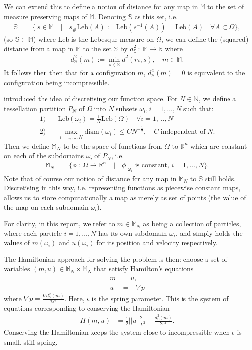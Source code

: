 \documentclass[11pt, oneside]{article}   	%
\newcommand{\R}{\mathbb{R}}
\newcommand{\MN}{\mathbb{M}_N}
\newcommand{\dsmsq}{d^{2}_{\mathbb{S}}(m)}
\newcommand{\graddsmsq}{\nabla{d^{2}_{\mathbb{S}}(m)}}
\newcommand{\M}{\mathbb{M}}
\newcommand{\N}{\mathbb{N}}
\newcommand{\Sb}{\mathbb{S}}
\newcommand{\Leb}{\mathrm{Leb}}
\begin{document}
We can extend this to define a notion of distance for any map in \(\M\) to the set of measure preserving maps of \(\M\). Denoting \(\Sb\) as this set, i.e. 
\begin{align}
\Sb &= \Big\{ \: s \in \M \quad | \quad s_{\#}\Leb(A) := \Leb(s^{-1}(A)) = \Leb(A) \quad \forall A \subset \Omega \Big\},
\end{align}
(so \(\Sb \subset \M\)) where \(\Leb\) is the Lebesque measure on \(\Omega\), we can define the (squared) distance from a map in \(\M\) to the set \(\Sb\) by \(d^2_\Sb \: : \: \M \to \R\) where
\begin{align}
\dsmsq := \min_{s \in \mathbb{S}} d^2(m, s), \quad m \in \M.
\end{align}
It follows then then that for a configuration \(m\), \(\dsmsq = 0\) is equivalent to the configuration being incompressible.

\cite{gallouet2016lagrangian} introduced the idea of discretising our function space. For \(N \in \N\), we define a tessellation partition \(P_N\) of \(\Omega\) into \(N\) subsets \(\omega_i, i=1,\dots,N\) such that:
\begin{align}
1)& \quad \Leb(\omega_i) = \frac{1}{N}\Leb(\Omega) \quad \forall i = 1,\dots,N \\
2)& \quad \max_{i = 1,\dots,N} \mathrm{diam}(\omega_i) \le CN^{-\frac{1}{2}}, \quad C \text{ independent of } N.
\end{align}
Then we define \(\MN\) to be the space of functions from \(\Omega\) to \(\R^n\) which are constant on each of the subdomains \(\omega_i\) of \(P_N\), i.e.
\begin{align}
\MN &= \Big\{ \phi \: : \: \Omega \to \R^n \quad | \quad \phi | _{\omega_i} \text{ is constant, } i = 1,\dots,N \Big\}.
\end{align}
Note that of course our notion of distance for any map in \(\MN\) to \(\Sb\) still holds. Discretising in this way, i.e. representing functions as piecewise constant maps, allows us to store computationally a map as merely as set of points (the value of the map on each subdomain \(\omega_i\)).

For clarity, in this report, we refer to \(m \in \MN\)  as being a collection of particles, where each particle \(i=1,\dots,N\) has its own subdomain \(\omega_i\), and simply holds the values of \(m(\omega_i)\) and \(u(\omega_i)\) for its position and velocity respectively.

The Hamiltonian approach for solving the problem is then: choose a set of variables \((m, u) \in \MN \times \MN \) that satisfy Hamilton's equations
\begin{align} 
\dot{m} &= u, \\
\dot{u} &= - \nabla p
\end{align}
where \(\nabla p = \frac{\graddsmsq}{2\epsilon^2}\). Here, \(\epsilon\) is the spring parameter. This is the system of equations corresponding to conserving the Hamiltonian
\begin{align} 
H(m, u) &= \frac{1}{2} ||u||^2_{L^2} + \frac{\dsmsq}{2\epsilon^2}.
\end{align}
Conserving the Hamiltonian keeps the system close to incompressible when \(\epsilon\) is small,  stiff spring. 
\end{document}
